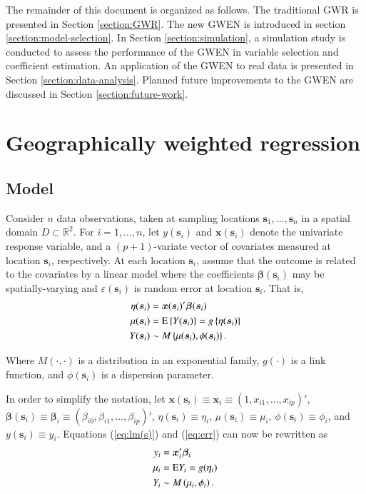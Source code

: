 \documentclass[authoryear, review, 11pt]{elsarticle}
\begin{document}
	The remainder of this document is organized as follows. The traditional GWR is presented in Section \ref{section:GWR}. The new GWEN is introduced in section \ref{section:model-selection}. In Section \ref{section:simulation}, a simulation study is conducted to assess the performance of the GWEN in variable selection and coefficient estimation. An application of the GWEN to real data is presented in Section \ref{section:data-analysis}. Planned future improvements to the GWEN are discussed in Section \ref{section:future-work}.

\section{Geographically weighted regression \label{section:GWR}}
	\subsection{Model}	
	Consider $n$ data observations, taken at sampling locations $\bm{s}_1, \dots, \bm{s}_n$ in a spatial domain $D \subset \mathbb{R}^2$. For $i = 1, \dots, n$, let $y(\bm{s}_i)$ and $\bm{x}(\bm{s}_i)$ denote the univariate response variable, and a $(p+1)$-variate vector of covariates measured at location $\bm{s}_i$, respectively. At each location $\bm{s}_i$, assume that the outcome is related to the covariates by a linear model where the coefficients $\bm{\beta}(\bm{s}_i)$ may be spatially-varying and $\varepsilon(\bm{s}_i)$ is random error at location $\bm{s}_i$. That is,
	\begin{align}\label{eq:lm(s)}
		\eta(\bm{s}_i) &= \bm{x}(\bm{s}_i)' \bm{\beta}(\bm{s}_i) \notag \\
        \mu(\bm{s}_i) &= \text{E} \left\{Y(\bm{s}_i)\right\} = g\left\{\eta(\bm{s}_i)\right\} \notag \\
        Y(\bm{s}_i) &\sim M\left\{\mu(\bm{s}_i), \phi(\bm{s}_i) \right\}.
	\end{align}
	
    Where $M(\cdot, \cdot)$ is a distribution in an exponential family, $g(\cdot)$ is a link function, and $\phi(\bm{s}_i)$ is a dispersion parameter.
	
	In order to simplify the notation, let $\bm{x}(\bm{s}_i) \equiv \bm{x}_i \equiv \left( 1, x_{i1}, \dots, x_{ip} \right)'$, $\bm{\beta}(\bm{s}_i) \equiv \bm{\beta}_i \equiv \left(\beta_{i0}, \beta_{i1}, \dots, \beta_{ip} \right)'$, $\eta(\bm{s}_i) \equiv \eta_i$, $\mu(\bm{s}_i) \equiv \mu_i$, $\phi(\bm{s}_i) \equiv \phi_i$, and $y(\bm{s}_i) \equiv y_i$.  Equations (\ref{eq:lm(s)}) and (\ref{eq:err}) can now be rewritten as
	\begin{align}
		y_i &= \bm{x}'_i \bm{\beta}_i \notag \\
        \mu_i &= \text{E} Y_i = g(\eta_i) \notag \\
        Y_i &\sim M\left(\mu_i, \phi_i \right).
	\end{align}
	
\end{document}
